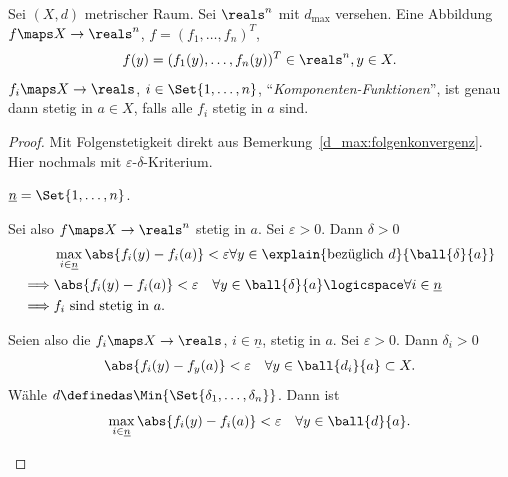 \begin{lemma}\label{d_max:metrischer_raum_zu_r_stetigkeit:komponenten}
    Sei \( (X,d)\) metrischer Raum. Sei \( \reals^n\) mit \( d_{\max}\) versehen. Eine Abbildung \( f\maps X\to \reals ^n\), \( f=(f_1,\ldots, f_n)^T\), 
    \begin{align*}
        f(y)=(f_1(y),\ldots, f_n(y))^T\in \reals^n, y\in X.
    \end{align*}   
    \( f_i\maps X\to \reals \), \( i\in \Set{1,\ldots,n}\), \enquote{\emph{Komponenten-Funktionen}}, ist genau dann stetig in \( a\in X\), falls alle \( f_i\) stetig in \( a\) sind.
\end{lemma}
\begin{proof}
    Mit Folgenstetigkeit direkt aus Bemerkung~\ref{d_max:folgenkonvergenz}. Hier nochmals mit \( \varepsilon\)-\( \delta\)-Kriterium.
    \begin{notation*}
        \( \underline{n}=\Set{1,\ldots,n}\). 
    \end{notation*}
    \begin{proofdescription}
        \item[\hin] Sei also \( f\maps X\to \reals^n\) stetig in \( a\). Sei \( \varepsilon>0\). Dann \texists \( \delta>0\) \sd
        \begin{align*}
            &\max_{i\in \underline{n}}\abs{f_i(y)-f_i(a)}<\varepsilon\forall y\in \explain{\text{bezüglich }d}{\ball{\delta}{a}}\\
            \implies &\abs{f_i(y)-f_i(a)}<\varepsilon\quad \forall y\in \ball{\delta}{a}\logicspace \forall i\in \underline{n}\\
            \implies &f_i\text{ sind stetig in }a.
        \end{align*}  
        \item[\rueck] Seien also die \( f_i\maps X\to \reals \), \( i\in \underline{n}\), stetig in \( a\). Sei \( \varepsilon>0\). Dann \texists \( \delta_i>0\) \sd 
        \begin{align*}
            \abs{f_i(y)-f_y(a)}<\varepsilon\quad \forall y\in \ball{d_i}{a}\subset X. 
        \end{align*}   
        Wähle \( d\definedas \Min{\Set{\delta_1,\ldots,\delta_n}}\). Dann ist
        \begin{align*}
            \max_{i\in \underline{n}}\abs{f_i(y)-f_i(a)}<\varepsilon\quad \forall y\in \ball{d}{a}. 
        \end{align*} 
    \end{proofdescription}
\end{proof}
